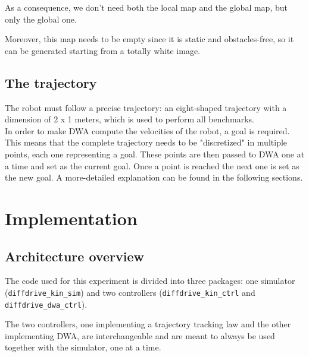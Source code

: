 \documentclass[11pt,a4paper]{article}
\begin{document}
As a consequence, we don't need both the local map and the global map, but only the global one.

Moreover, this map needs to be empty since it is static and obstacles-free, so it can be
generated starting from a totally white image.



\subsection{The trajectory}

The robot must follow a precise trajectory: an eight-shaped trajectory with a dimension of 2 x 1 meters,
which is used to perform all benchmarks.\\

In order to make DWA compute the velocities of the robot, a goal is required.
This means that the complete trajectory needs to be "discretized" in multiple points, each one representing a goal.
These points are then passed to DWA one at a time and set as the current goal.
Once a point is reached the next one is set as the new goal.
A more-detailed explanation can be found in the following sections.





\section{Implementation}



\subsection{Architecture overview}

The code used for this experiment is divided into three packages: one simulator (\texttt{diffdrive\_kin\_sim})
and two controllers (\texttt{diffdrive\_kin\_ctrl} and \texttt{diffdrive\_dwa\_ctrl}).

The two controllers, one implementing a trajectory tracking law and the other implementing DWA,
are interchangeable and are meant to always be used together with the simulator, one at a time.
\end{document}
